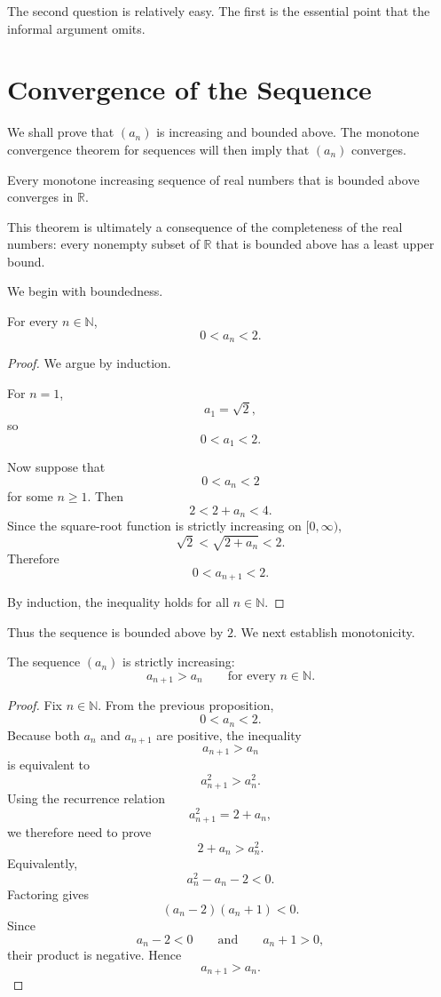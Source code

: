 \documentclass{essay}
\begin{document}
The second question is relatively easy. The first is the essential point that the informal argument omits.

\section{Convergence of the Sequence}

We shall prove that \((a_{n})\) is increasing and bounded above. The monotone convergence theorem for sequences will then imply that \((a_{n})\) converges.

\begin{theorem}
  Every monotone increasing sequence of real numbers that is bounded above converges in \(\mathbb{R}\).
\end{theorem}

This theorem is ultimately a consequence of the completeness of the real numbers: every nonempty subset of \(\mathbb{R}\) that is bounded above has a least upper bound.

We begin with boundedness.

\begin{proposition}
  For every \(n\in\mathbb{N}\),
  \[ 0<a_{n}<2. \]
\end{proposition}

\begin{proof}
  We argue by induction.

  For \(n=1\),
  \[ a_{1}=\sqrt{2}, \]
  so
  \[ 0<a_{1}<2. \]

  Now suppose that
  \[ 0<a_{n}<2 \]
  for some \(n\geq 1\). Then
  \[ 2<2+a_{n}<4. \]
  Since the square-root function is strictly increasing on \([0,\infty)\),
  \[ \sqrt{2}<\sqrt{2+a_{n}}<2. \]
  Therefore
  \[ 0<a_{n+1}<2. \]

  By induction, the inequality holds for all \(n\in\mathbb{N}\).
\end{proof}

Thus the sequence is bounded above by \(2\). We next establish monotonicity.

\begin{proposition}
  The sequence \((a_{n})\) is strictly increasing:
  \[ a_{n+1}>a_{n} \qquad \text{for every } n\in\mathbb{N}. \]
\end{proposition}

\begin{proof}
  Fix \(n\in\mathbb{N}\). From the previous proposition,
  \[ 0<a_{n}<2. \]
  Because both \(a_{n}\) and \(a_{n+1}\) are positive, the inequality
  \[ a_{n+1}>a_{n} \]
  is equivalent to
  \[ a_{n+1}^{2}>a_{n}^{2}. \]
  Using the recurrence relation
  \[ a_{n+1}^{2}=2+a_{n}, \]
  we therefore need to prove
  \[ 2+a_{n}>a_{n}^{2}. \]
  Equivalently,
  \[ a_{n}^{2}-a_{n}-2<0. \]
  Factoring gives
  \[ (a_{n}-2)(a_{n}+1)<0. \]
  Since
  \[ a_{n}-2<0 \qquad\text{and}\qquad a_{n}+1>0, \]
  their product is negative. Hence
  \[ a_{n+1}>a_{n}. \]
\end{proof}
\end{document}
